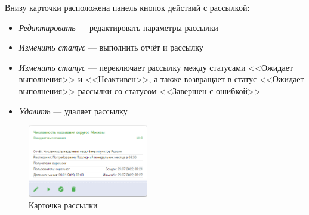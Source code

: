 \documentclass[../user-manual.tex]{subfiles}
\begin{document}
	
	Внизу карточки расположена панель кнопок действий с рассылкой:
	
	\begin{itemize}
		\item \textit{Редактировать} --- редактировать параметры рассылки
		
		\item \textit{Изменить статус} --- выполнить отчёт и рассылку
		
		\item \textit{Изменить статус} --- переключает рассылку между статусами <<Ожидает выполнения>> и <<Неактивен>>, а также возвращает в статус <<Ожидает выполнения>> рассылки со статусом <<Завершен с ошибкой>>
		
		\item \textit{Удалить} --- удаляет рассылку
	\end{itemize}
	
	\begin{figure}[h]
		\centering
		\includegraphics[width=0.47\textwidth]{img/35-schedule-report-card.png}
		\caption{Карточка рассылки}
		\label{fig:schedule-report-card}
	\end{figure}
	
\end{document}
